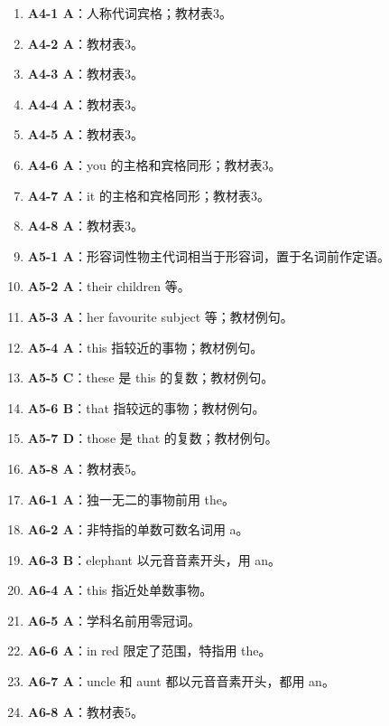 \documentclass[11pt,a4paper]{ctexart}
\begin{document}
\begin{enumerate}[leftmargin=1.6em,itemsep=2pt]
\item \textbf{A4-1 A}：人称代词宾格；教材表3。
\item \textbf{A4-2 A}：教材表3。
\item \textbf{A4-3 A}：教材表3。
\item \textbf{A4-4 A}：教材表3。
\item \textbf{A4-5 A}：教材表3。
\item \textbf{A4-6 A}：you 的主格和宾格同形；教材表3。
\item \textbf{A4-7 A}：it 的主格和宾格同形；教材表3。
\item \textbf{A4-8 A}：教材表3。
\item \textbf{A5-1 A}：形容词性物主代词相当于形容词，置于名词前作定语。
\item \textbf{A5-2 A}：their children 等。
\item \textbf{A5-3 A}：her favourite subject 等；教材例句。
\item \textbf{A5-4 A}：this 指较近的事物；教材例句。
\item \textbf{A5-5 C}：these 是 this 的复数；教材例句。
\item \textbf{A5-6 B}：that 指较远的事物；教材例句。
\item \textbf{A5-7 D}：those 是 that 的复数；教材例句。
\item \textbf{A5-8 A}：教材表5。
\item \textbf{A6-1 A}：独一无二的事物前用 the。
\item \textbf{A6-2 A}：非特指的单数可数名词用 a。
\item \textbf{A6-3 B}：elephant 以元音音素开头，用 an。
\item \textbf{A6-4 A}：this 指近处单数事物。
\item \textbf{A6-5 A}：学科名前用零冠词。
\item \textbf{A6-6 A}：in red 限定了范围，特指用 the。
\item \textbf{A6-7 A}：uncle 和 aunt 都以元音音素开头，都用 an。
\item \textbf{A6-8 A}：教材表5。
\end{enumerate}
\end{document}
